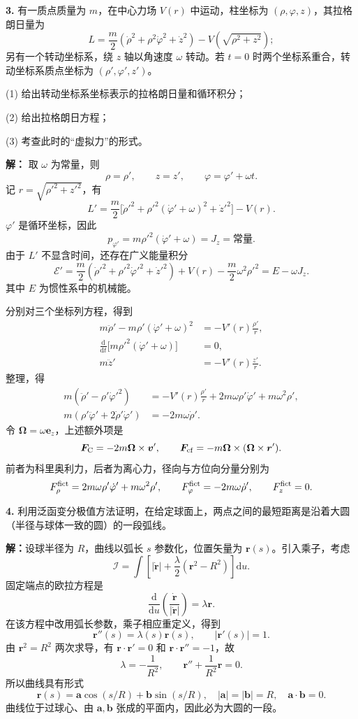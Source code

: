 \documentclass[11pt,a4paper]{ctexart}
\begin{document}
\noindent\textbf{3.} 有一质点质量为 $m$，在中心力场 $V(r)$ 中运动，柱坐标为 $(\rho,\varphi,z)$，其拉格朗日量为
\[
L=\frac m2(\dot\rho^2+\rho^2\dot\varphi^2+\dot z^2)-V(\sqrt{\rho^2+z^2});
\]
另有一个转动坐标系，绕 $z$ 轴以角速度 $\omega$ 转动。若 $t=0$ 时两个坐标系重合，转动坐标系质点坐标为 $(\rho',\varphi',z')$。

(1) 给出转动坐标系坐标表示的拉格朗日量和循环积分；

(2) 给出拉格朗日方程；

(3) 考查此时的“虚拟力”的形式。

\noindent\textbf{解：}
取 $\omega$ 为常量，则
\[
\rho=\rho',\qquad z=z',\qquad\varphi=\varphi'+\omega t.
\]
记 $r=\sqrt{\rho'^2+z'^2}$，有
\[
{L'=\frac m2\bigl[\dot\rho'^2+\rho'^2(\dot\varphi'+\omega)^2+\dot z'^2\bigr]-V(r)}.
\]
$\varphi'$ 是循环坐标，因此
\[
{p_{\varphi'}=m\rho'^2(\dot\varphi'+\omega)=J_z=\text{常量}}.
\]
由于 $L'$ 不显含时间，还存在广义能量积分
\[
\mathcal E'=\frac m2(\dot\rho'^2+\rho'^2\dot\varphi'^2+\dot z'^2)+V(r)-\frac m2\omega^2\rho'^2
=E-\omega J_z.
\]
其中 $E$ 为惯性系中的机械能。

分别对三个坐标列方程，得到
\[
{\begin{aligned}
m\ddot\rho'-m\rho'(\dot\varphi'+\omega)^2&=-V'(r)\frac{\rho'}r,\\
\frac{\mathrm d}{\mathrm dt}\bigl[m\rho'^2(\dot\varphi'+\omega)\bigr]&=0,\\
m\ddot z'&=-V'(r)\frac{z'}r.
\end{aligned}}
\]
整理，得
\[
\begin{aligned}
m(\ddot\rho'-\rho'\dot\varphi'^2)&=-V'(r)\frac{\rho'}r+2m\omega\rho'\dot\varphi'+m\omega^2\rho',\\
m(\rho'\ddot\varphi'+2\dot\rho'\dot\varphi')&=-2m\omega\dot\rho'.
\end{aligned}
\]
令 $\bm\Omega=\omega\bm e_z$，上述额外项是
\[
{\bm F_{\rm C}=-2m\bm\Omega\times\bm v',\qquad
\bm F_{\rm cf}=-m\bm\Omega\times(\bm\Omega\times\bm r')}.
\]
前者为科里奥利力，后者为离心力，径向与方位向分量分别为
\[
F_\rho^{\rm fict}=2m\omega\rho'\dot\varphi'+m\omega^2\rho',\qquad
F_\varphi^{\rm fict}=-2m\omega\dot\rho',\qquad F_z^{\rm fict}=0.
\]

\noindent\textbf{4.} 利用泛函变分极值方法证明，在给定球面上，两点之间的最短距离是沿着大圆（半径与球体一致的圆）的一段弧线。

\noindent\textbf{解：}设球半径为 $R$，曲线以弧长 $s$ 参数化，位置矢量为 $\bm r(s)$。引入乘子，考虑
\[
\mathcal I=\int\left[|\dot{\bm r}|+\frac{\lambda}2(\bm r^2-R^2)\right]\mathrm du.
\]
固定端点的欧拉方程是
\[
\frac{\mathrm d}{\mathrm du}\left(\frac{\dot{\bm r}}{|\dot{\bm r}|}\right)=\lambda\bm r.
\]
在该方程中改用弧长参数，乘子相应重定义，得到
\[
\bm r''(s)=\lambda(s)\bm r(s),\qquad |\bm r'(s)|=1.
\]
由 $\bm r^2=R^2$ 两次求导，有 $\bm r\cdot\bm r'=0$ 和 $\bm r\cdot\bm r''=-1$，故
\[
\lambda=-\frac1{R^2},\qquad \bm r''+\frac1{R^2}\bm r=0.
\]
所以曲线具有形式
\[
\bm r(s)=\bm a\cos(s/R)+\bm b\sin(s/R),
\quad |\bm a|=|\bm b|=R,\quad \bm a\cdot\bm b=0.
\]
曲线位于过球心、由 $\bm a,\bm b$ 张成的平面内，因此必为大圆的一段。
\end{document}
